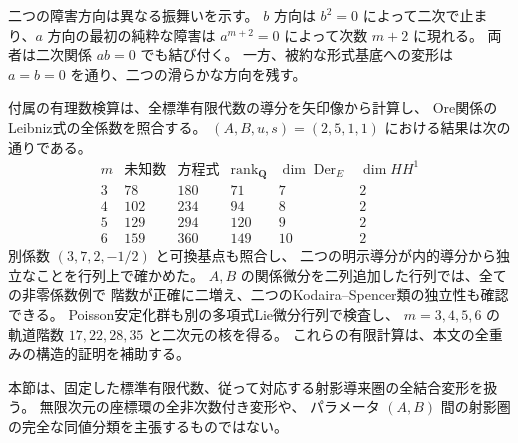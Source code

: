 二つの障害方向は異なる振舞いを示す。
$b$ 方向は $b^2=0$ によって二次で止まり、$a$ 方向の最初の純粋な障害は
$a^{m+2}=0$ によって次数 $m+2$ に現れる。
両者は二次関係 $ab=0$ でも結び付く。
一方、被約な形式基底への変形は $a=b=0$ を通り、二つの滑らかな方向を残す。

付属の有理数検算は、全標準有限代数の導分を矢印像から計算し、
Ore関係のLeibniz式の全係数を照合する。
$(A,B,u,s)=(2,5,1,1)$ における結果は次の通りである。
\[
 \begin{array}{c|r|r|r|r|r}
 m&\text{未知数}&\text{方程式}&\operatorname{rank}_{\mathbf Q}
 &\dim\operatorname{Der}_E&\dim HH^1\\\hline
 3&78&180&71&7&2\\
 4&102&234&94&8&2\\
 5&129&294&120&9&2\\
 6&159&360&149&10&2
 \end{array}
\]
別係数 $(3,7,2,-1/2)$ と可換基点も照合し、
二つの明示導分が内的導分から独立なことを行列上で確かめた。
$A,B$ の関係微分を二列追加した行列では、全ての非零係数例で
階数が正確に二増え、二つのKodaira--Spencer類の独立性も確認できる。
Poisson安定化群も別の多項式Lie微分行列で検査し、
$m=3,4,5,6$ の軌道階数 $17,22,28,35$ と二次元の核を得る。
これらの有限計算は、本文の全重みの構造的証明を補助する。

本節は、固定した標準有限代数、従って対応する射影導来圏の全結合変形を扱う。
無限次元の座標環の全非次数付き変形や、
パラメータ $(A,B)$ 間の射影圏の完全な同値分類を主張するものではない。
